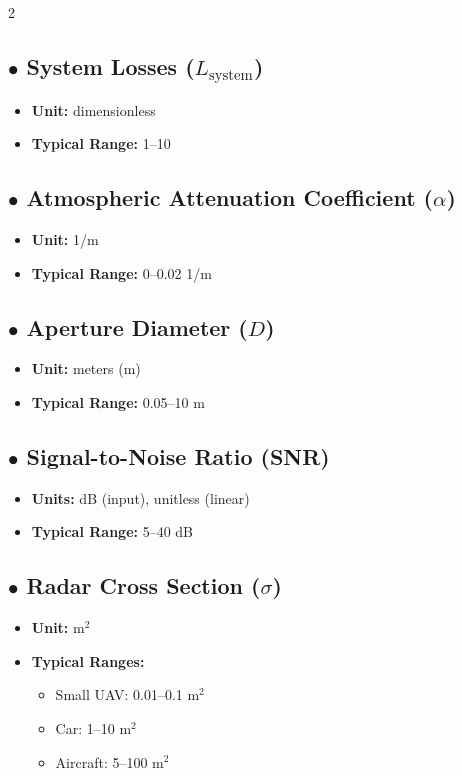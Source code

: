 \documentclass{article}
\begin{document}
\begin{multicols}{2}
	\subsection*{$\bullet$ System Losses ($L_\text{system}$)}
	\begin{itemize}
		\item \textbf{Unit:} dimensionless
		\item \textbf{Typical Range:} 1--10
	\end{itemize}
	
	\subsection*{$\bullet$ Atmospheric Attenuation Coefficient ($\alpha$)}
	\begin{itemize}
		\item \textbf{Unit:} 1/m
		\item \textbf{Typical Range:} 0--0.02 1/m
	\end{itemize}
	
	\subsection*{$\bullet$ Aperture Diameter ($D$)}
	\begin{itemize}
		\item \textbf{Unit:} meters (m)
		\item \textbf{Typical Range:} 0.05--10 m
	\end{itemize}
	
	\subsection*{$\bullet$ Signal-to-Noise Ratio (SNR)}
	\begin{itemize}
		\item \textbf{Units:} dB (input), unitless (linear)
		\item \textbf{Typical Range:} 5--40 dB
	\end{itemize}
	
	\subsection*{$\bullet$ Radar Cross Section ($\sigma$)}
	\begin{itemize}
		\item \textbf{Unit:} m$^2$
		\item \textbf{Typical Ranges:}
		\begin{itemize}
			\item Small UAV: 0.01--0.1 m$^2$
			\item Car: 1--10 m$^2$
			\item Aircraft: 5--100 m$^2$
		\end{itemize}
	\end{itemize}
	

\end{multicols}
\end{document}
